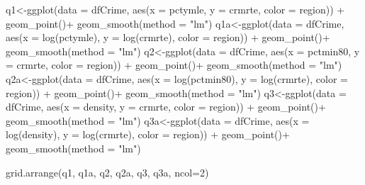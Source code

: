 \documentclass[]{article}
\newenvironment{Shaded}{}{}
\newcommand{\DataTypeTok}[1]{#1}
\newcommand{\DecValTok}[1]{#1}
\newcommand{\KeywordTok}[1]{\textcolor[rgb]{0.00,0.00,1.00}{#1}}
\newcommand{\NormalTok}[1]{#1}
\newcommand{\OperatorTok}[1]{#1}
\newcommand{\StringTok}[1]{\textcolor[rgb]{0.00,0.50,0.50}{#1}}
\begin{document}
\begin{Shaded}
\begin{Highlighting}[]
\NormalTok{q1<-}\KeywordTok{ggplot}\NormalTok{(}\DataTypeTok{data =}\NormalTok{ dfCrime, }\KeywordTok{aes}\NormalTok{(}\DataTypeTok{x =}\NormalTok{ pctymle, }\DataTypeTok{y =}\NormalTok{ crmrte, }\DataTypeTok{color =}\NormalTok{ region)) }\OperatorTok{+}\StringTok{ }
\StringTok{      }\KeywordTok{geom_point}\NormalTok{()}\OperatorTok{+}
\StringTok{  }\KeywordTok{geom_smooth}\NormalTok{(}\DataTypeTok{method =} \StringTok{"lm"}\NormalTok{)}
\NormalTok{q1a<-}\KeywordTok{ggplot}\NormalTok{(}\DataTypeTok{data =}\NormalTok{ dfCrime, }\KeywordTok{aes}\NormalTok{(}\DataTypeTok{x =} \KeywordTok{log}\NormalTok{(pctymle), }\DataTypeTok{y =} \KeywordTok{log}\NormalTok{(crmrte), }\DataTypeTok{color =}\NormalTok{ region)) }\OperatorTok{+}\StringTok{ }
\StringTok{      }\KeywordTok{geom_point}\NormalTok{()}\OperatorTok{+}
\StringTok{  }\KeywordTok{geom_smooth}\NormalTok{(}\DataTypeTok{method =} \StringTok{"lm"}\NormalTok{)}
\NormalTok{q2<-}\KeywordTok{ggplot}\NormalTok{(}\DataTypeTok{data =}\NormalTok{ dfCrime, }\KeywordTok{aes}\NormalTok{(}\DataTypeTok{x =}\NormalTok{ pctmin80, }\DataTypeTok{y =}\NormalTok{ crmrte, }\DataTypeTok{color =}\NormalTok{ region)) }\OperatorTok{+}\StringTok{ }
\StringTok{      }\KeywordTok{geom_point}\NormalTok{()}\OperatorTok{+}
\StringTok{  }\KeywordTok{geom_smooth}\NormalTok{(}\DataTypeTok{method =} \StringTok{"lm"}\NormalTok{)}
\NormalTok{q2a<-}\KeywordTok{ggplot}\NormalTok{(}\DataTypeTok{data =}\NormalTok{ dfCrime, }\KeywordTok{aes}\NormalTok{(}\DataTypeTok{x =} \KeywordTok{log}\NormalTok{(pctmin80), }\DataTypeTok{y =} \KeywordTok{log}\NormalTok{(crmrte), }\DataTypeTok{color =}\NormalTok{ region)) }\OperatorTok{+}\StringTok{ }
\StringTok{      }\KeywordTok{geom_point}\NormalTok{()}\OperatorTok{+}
\StringTok{  }\KeywordTok{geom_smooth}\NormalTok{(}\DataTypeTok{method =} \StringTok{"lm"}\NormalTok{)}
\NormalTok{q3<-}\KeywordTok{ggplot}\NormalTok{(}\DataTypeTok{data =}\NormalTok{ dfCrime, }\KeywordTok{aes}\NormalTok{(}\DataTypeTok{x =}\NormalTok{ density, }\DataTypeTok{y =}\NormalTok{ crmrte, }\DataTypeTok{color =}\NormalTok{ region)) }\OperatorTok{+}\StringTok{ }
\StringTok{      }\KeywordTok{geom_point}\NormalTok{()}\OperatorTok{+}
\StringTok{  }\KeywordTok{geom_smooth}\NormalTok{(}\DataTypeTok{method =} \StringTok{"lm"}\NormalTok{)}
\NormalTok{q3a<-}\KeywordTok{ggplot}\NormalTok{(}\DataTypeTok{data =}\NormalTok{ dfCrime, }\KeywordTok{aes}\NormalTok{(}\DataTypeTok{x =} \KeywordTok{log}\NormalTok{(density), }\DataTypeTok{y =} \KeywordTok{log}\NormalTok{(crmrte), }\DataTypeTok{color =}\NormalTok{ region)) }\OperatorTok{+}\StringTok{ }
\StringTok{      }\KeywordTok{geom_point}\NormalTok{()}\OperatorTok{+}
\StringTok{  }\KeywordTok{geom_smooth}\NormalTok{(}\DataTypeTok{method =} \StringTok{"lm"}\NormalTok{)}


\KeywordTok{grid.arrange}\NormalTok{(q1, q1a, q2, q2a, q3, q3a, }\DataTypeTok{ncol=}\DecValTok{2}\NormalTok{)}
\end{Highlighting}
\end{Shaded}
\end{document}
